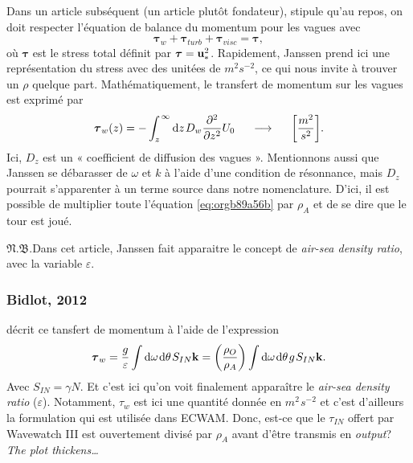 \documentclass[10pt]{article}
\numberwithin{equation}{section}
\newcommand{\uu}{\vb{u}}
\newcommand{\pt}{\hspace{1pt}} %
\newcommand{\nb}{\underline{{\footnotesize\EightStarConvex}\pt $\mathfrak{N.B.}$\vphantom{p}}\hspace{3pt}}
\begin{document}
Dans un article subséquent (un article plutôt fondateur), \textcite[voir eq. 7 et 8 de l'article]{janssen_1991}  stipule qu'au repos, on doit respecter l'équation de balance du momentum pour les vagues avec
\begin{equation}
\label{eq:orgb89a56b}
   \boldsymbol{\tau}_w + \boldsymbol{\tau}_{turb} + \boldsymbol{\tau}_{visc}  = \boldsymbol{\tau},
\end{equation}
où \(\boldsymbol{\tau}\) est le stress total définit par \(\boldsymbol{\tau} = \uu_*^2\).
Rapidement, Janssen prend ici une représentation du stress avec des unitées de \(m^{2} s^{-2}\), ce qui nous invite à trouver un \(\rho\) quelque part.
Mathématiquement, le transfert de momentum sur les vagues est exprimé par
\begin{equation}
   \boldsymbol{\tau}_w(z) = - \int_z^{\pt\infty} \mathrm{d}z\pt D_w \pdv[2]{}{z} U_0 \hspace{0.5cm} \longrightarrow \hspace{0.5cm} \qty[\frac{m^2}{s^2}].
\end{equation}
Ici, \(D_z\) est un « coefficient de diffusion des vagues ».
Mentionnons aussi que Janssen se débarasser de \(\omega\) et \(k\) à l'aide d'une condition de résonnance, mais \(D_z\) pourrait s'apparenter à un terme source dans notre nomenclature.
D'ici, il est possible de multiplier toute l'équation \ref{eq:orgb89a56b} par \(\rho_A\) et de se dire que le tour est joué.\bigskip

\nb Dans cet article, Janssen fait apparaitre le concept de \emph{air-sea density ratio}, avec la variable \(\varepsilon\).
\subsubsection{Bidlot, 2012}
\label{sec:orgf788357}

\Textcite[voir eq. 6 de l'article]{bidlot2012present} décrit ce tansfert de momentum à l'aide de l'expression
\begin{equation}
   \boldsymbol{\tau}_w = \frac{g}{\varepsilon} \int \mathrm{d}\omega\pt \mathrm{d}\theta\pt S_{IN} \vb{k} = \qty(\frac{\rho_O}{\rho_A}) \int \mathrm{d}\omega\pt \mathrm{d}\theta\pt g\pt S_{IN} \vb{k}.
\end{equation}
Avec \(S_{IN} = \gamma N\).
Et c'est ici qu'on voit finalement apparaître le \emph{air-sea density ratio} (\(\varepsilon\)).
Notamment, \(\tau_w\) est ici une quantité donnée en \(m^2\pt s^{-2}\) et c'est d'ailleurs la formulation qui est utilisée dans ECWAM.
Donc, est-ce que le \(\tau_{IN}\) offert par Wavewatch III est ouvertement divisé par \(\rho_A\) avant d'être transmis en \emph{output}?
\emph{The plot thickens\ldots{}}
\end{document}
